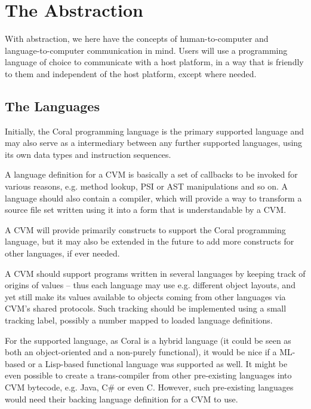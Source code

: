 \chapter{The Abstraction}

With abstraction, we here have the concepts of human-to-computer and language-to-computer communication in mind. Users will use a programming language of choice to communicate with a host platform, in a way that is friendly to them and independent of the host platform, except where needed. 







\section{The Languages}

Initially, the Coral programming language is the primary supported language and may also serve as a intermediary between any further supported languages, using its own data types and instruction sequences. 

A language definition for a CVM is basically a set of callbacks to be invoked for various reasons, e.g. method lookup, PSI or AST manipulations and so on. A language should also contain a compiler, which will provide a way to transform a source file set written using it into a form that is understandable by a CVM. 

A CVM will provide primarily constructs to support the Coral programming language, but it may also be extended in the future to add more constructs for other languages, if ever needed. 

A CVM should support programs written in several languages by keeping track of origins of values -- thus each language may use e.g. different object layouts, and yet still make its values available to objects coming from other languages via CVM's shared protocols. Such tracking should be implemented using a small tracking label, possibly a number mapped to loaded language definitions. 

For the supported language, as Coral is a hybrid language (it could be seen as both an object-oriented and a non-purely functional), it would be nice if a ML-based or a Lisp-based functional language was supported as well. It might be even possible to create a trans-compiler from other pre-existing languages into CVM bytecode, e.g. Java, C\# or even C. However, such pre-existing languages would need their backing language definition for a CVM to use. 





